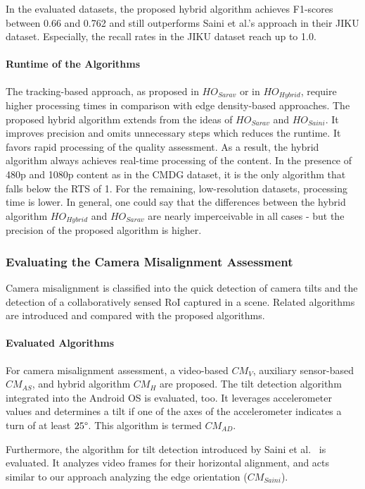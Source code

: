 In the evaluated datasets, the proposed hybrid algorithm achieves F1-scores between 0.66 and 0.762 and still outperforms Saini et al.'s approach in their JIKU dataset.
Especially, the recall rates in the JIKU dataset reach up to 1.0. 
\paragraph{Runtime of the Algorithms}
The tracking-based approach, as proposed in $HO_{Sarav}$ or in $HO_{Hybrid}$, require higher processing times in comparison with edge density-based approaches.
The proposed hybrid algorithm extends from the ideas of $HO_{Sarav}$ and $HO_{Saini}$. It improves precision and omits unnecessary steps which reduces the runtime.
It favors rapid processing of the quality assessment.  
As a result, the hybrid algorithm always achieves real-time processing of the content.
In the presence of 480p and 1080p content as in the CMDG dataset, it is the only algorithm that falls below the RTS of 1.
For the remaining, low-resolution datasets, processing time is lower. 
In general, one could say that the differences between the hybrid algorithm $HO_{Hybrid}$ and $HO_{Sarav}$ are nearly imperceivable in all cases - but the precision of the proposed algorithm is higher.
\subsubsection{Evaluating the Camera Misalignment Assessment}
Camera misalignment is classified into the quick detection of camera tilts and the detection of a collaboratively sensed \ac{RoI} captured in a scene.
Related algorithms are introduced and compared with the proposed algorithms.
\paragraph{Evaluated Algorithms}
For camera misalignment assessment, a video-based $CM_{V}$, auxiliary sensor-based $CM_{AS}$, and hybrid algorithm $CM_{H}$ are proposed.
The tilt detection algorithm integrated into the Android \ac{OS} is evaluated, too.
It leverages accelerometer values and determines a tilt if one of the axes of the accelerometer indicates a turn of at least $25\degree$.
This algorithm is termed $CM_{AD}$.

Furthermore, the algorithm for tilt detection introduced by Saini et al.~\cite{Saini2012} is evaluated.
It analyzes video frames for their horizontal alignment, and acts similar to our approach analyzing the edge orientation ($CM_{Saini}$).
